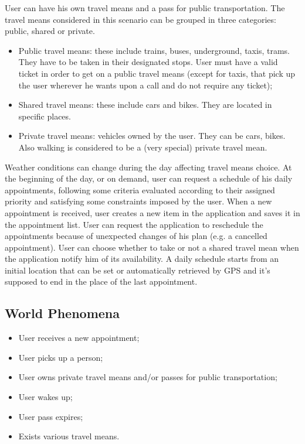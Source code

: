 User can have his own travel means and a pass for public transportation. 
The travel means considered in this scenario can be grouped in three categories: public, shared or private.
\begin{itemize}
\item Public travel means: these include trains, buses, underground, taxis, trams. They have to be taken in their designated stops. User must have a valid ticket in order to get on a public travel means (except for taxis, that pick up the user wherever he wants upon a call and do not require any ticket);

\item Shared travel means: these include cars and bikes. They are located in specific places.

\item Private travel means: vehicles owned by the user. They can be cars, bikes. Also walking is considered to be a (very special) private travel mean.
\end{itemize}

Weather conditions can change during the day affecting travel means choice.
At the beginning of the day, or on demand, user can request a schedule of his daily appointments, following some criteria evaluated according to their assigned priority and satisfying some constraints imposed by the user.
When a new appointment is received, user creates a new item in the application and saves it in the appointment list. User can request the application to reschedule the appointments because of unexpected changes of his plan (e.g. a cancelled appointment).
User can choose whether to take or not a shared travel mean when the application notify him of its availability.
A daily schedule starts from an initial location that can be set or automatically retrieved by GPS and it's supposed to end in the place of the last appointment. 

\subsection{World Phenomena}
\begin{itemize}
\item User receives a new appointment;
\item User picks up a person;
\item User owns private travel means and/or passes for public transportation;
\item User wakes up;
\item User pass expires;
\item Exists various travel means.
\end{itemize}

